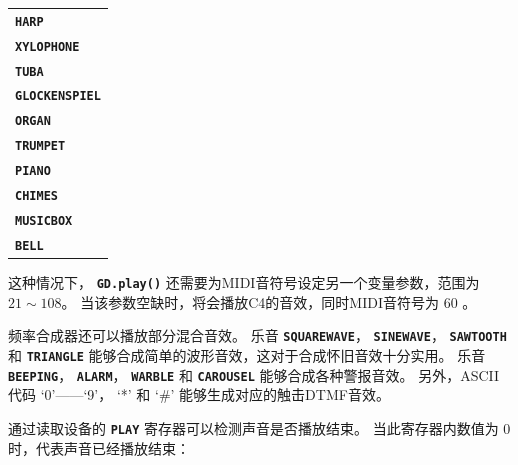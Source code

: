 \documentclass[10pt]{book}
\newcommand{\mach}[1]{\texttt{\textbf{#1}}}
\begin{document}
\begin{CJK}{UTF8}{gkai}
\label{instruments}

\vspace{10pt}
\begin{tabular}{l}
\mach{HARP} \\
\mach{XYLOPHONE} \\
\mach{TUBA} \\
\mach{GLOCKENSPIEL} \\
\mach{ORGAN} \\
\mach{TRUMPET} \\
\mach{PIANO} \\
\mach{CHIMES} \\
\mach{MUSICBOX} \\
\mach{BELL}
\end{tabular}
\vspace{10pt}

\noindent
这种情况下， \mach{GD.play()} 还需要为MIDI音符号设定另一个变量参数，范围为 $21\sim108$。
当该参数空缺时，将会播放C4的音效，同时MIDI音符号为 $60$ 。

频率合成器还可以播放部分混合音效。
乐音
\mach{SQUAREWAVE}，
\mach{SINEWAVE}，
\mach{SAWTOOTH} 和
\mach{TRIANGLE} 
能够合成简单的波形音效，这对于合成怀旧音效十分实用。
乐音
\mach{BEEPING}，
\mach{ALARM}，
\mach{WARBLE} 和
\mach{CAROUSEL}
能够合成各种警报音效。
另外，ASCII代码 `0'——`9'， `*' 和 `\#' 能够生成对应的触击DTMF音效。

通过读取设备的 \mach{PLAY} 寄存器可以检测声音是否播放结束。
当此寄存器内数值为 $0$ 时，代表声音已经播放结束：


\end{CJK}
\end{document}
